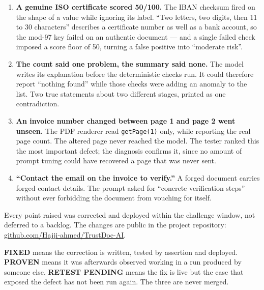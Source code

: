 \documentclass[10pt,a4paper]{article}
\newcommand{\heading}[2]{%
  \par\vspace{8pt}{\color{navy}\bfseries #1\hspace{6pt}#2}\par\vspace{-3pt}}
\newcommand{\fld}[1]{\textbf{\color{navy}#1}\hspace{5pt}}
\begin{document}
\vspace{3pt}
\begin{enumerate}[label=\textcolor{navy}{\bfseries\arabic*.}]
  \item \fld{A genuine ISO certificate scored 50/100.}
        The IBAN checksum fired on the shape of a value while ignoring its
        label. ``Two letters, two digits, then 11 to 30 characters'' describes a
        certificate number as well as a bank account, so the mod-97 key failed
        on an authentic document --- and a single failed check imposed a score
        floor of 50, turning a false positive into ``moderate risk''.

  \item \fld{The count said one problem, the summary said none.}
        The model writes its explanation before the deterministic checks run.
        It could therefore report ``nothing found'' while those checks were
        adding an anomaly to the list. Two true statements about two different
        stages, printed as one contradiction.

  \item \fld{An invoice number changed between page 1 and page 2 went unseen.}
        The PDF renderer read \texttt{getPage(1)} only, while reporting the real
        page count. The altered page never reached the model. The tester ranked
        this the most important defect; the diagnosis confirms it, since no
        amount of prompt tuning could have recovered a page that was never sent.

  \item \fld{``Contact the email on the invoice to verify.''}
        A forged document carries forged contact details. The prompt asked for
        ``concrete verification steps'' without ever forbidding the document
        from vouching for itself.
\end{enumerate}

\newpage

\heading{3.}{From feedback to shipped change}

Every point raised was corrected and deployed within the challenge window, not
deferred to a backlog. The changes are public in the project repository:
\href{https://github.com/Hajji-ahmed/TrustDoc-AI}{github.com/Hajji-ahmed/TrustDoc-AI}.

\vspace{2pt}
{\footnotesize\color{muted}\textbf{FIXED} means the correction is written,
tested by assertion and deployed. \textbf{PROVEN} means it was afterwards
observed working in a run produced by someone else. \textbf{RETEST PENDING}
means the fix is live but the case that exposed the defect has not been run
again. The three are never merged.}
\end{document}
